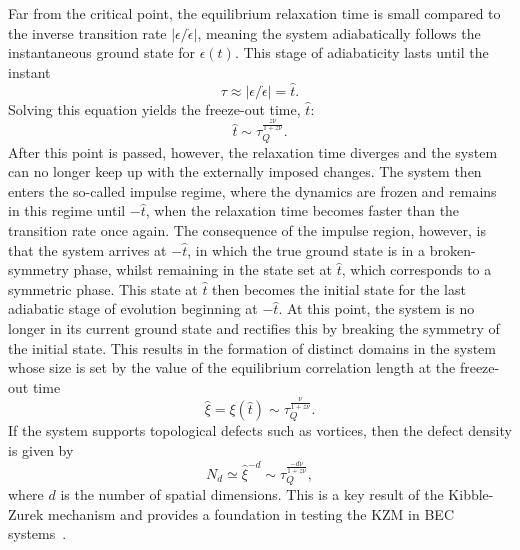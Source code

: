 Far from the critical point, the equilibrium relaxation time is small compared
to the inverse transition rate \( |\epsilon/\dot{\epsilon}| \), meaning the system
adiabatically follows the instantaneous ground state for \( \epsilon(t) \).
This stage of adiabaticity lasts until the instant
\begin{equation}
    \tau \approx |\epsilon/\dot{\epsilon}|=\hat{t}.
    \label{eq: freeze-out-equal}
\end{equation}
Solving this equation yields the freeze-out time, \( \hat{t} \):
\begin{equation}
    \hat{t} \sim \tau_Q^\frac{z\nu}{1 + z\nu}.
    \label{eq: freeze-out-scaling}
\end{equation}
After this point is passed, however, the relaxation time diverges and the system
can no longer keep up with the externally imposed changes.
The system then enters the so-called impulse regime, where the dynamics are
frozen and remains in this regime until \( -\hat{t} \), when the relaxation
time becomes faster than the transition rate once again.
The consequence of the impulse region, however, is that the system arrives at
\( -\hat{t} \), in which the true ground state is in a broken-symmetry phase,
whilst remaining in the state set at \( \hat{t} \), which corresponds to a
symmetric phase.
This state at \( \hat{t} \) then becomes the initial state for the last adiabatic
stage of evolution beginning at \( -\hat{t} \).
At this point, the system is no longer in its current ground state and rectifies
this by breaking the symmetry of the initial state.
This results in the formation of distinct domains in the system whose size is
set by the value of the equilibrium correlation length at the freeze-out time
\begin{equation}
    \hat{\xi}=\xi(\hat{t}) \sim \tau_Q^{\frac{\nu}{1 + z\nu}}.
    \label{eq: KZM-domain-size}
\end{equation}
If the system supports topological defects such as vortices, then the defect
density is given by
\begin{equation}\label{eq: KZM-defects-scaling}
    N_d \simeq \hat{\xi}^{-d} \sim \tau_Q^{\frac{-d\nu}{1+z\nu}},
\end{equation}
where \( d \) is the number of spatial dimensions.
This is a key result of the Kibble-Zurek mechanism and provides a
foundation in testing the KZM in BEC systems~\cite{Damski2007, Swislocki2013,
    Anquez2016, Saito2007, Saito2007a}.

